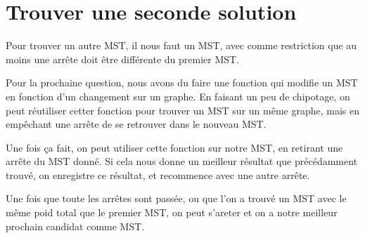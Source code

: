 \section{Trouver une seconde solution}

Pour trouver un autre MST, il nous faut un MST, avec comme restriction que au moins une arrête doit être différente du premier MST.

Pour la prochaine question, nous avons du faire une fonction qui modifie un MST en fonction d'un changement sur un graphe.
En faisant un peu de chipotage, on peut réutiliser cetter fonction pour trouver un MST sur un même graphe, mais en empêchant une arrête de se retrouver dans le nouveau MST.

Une fois ça fait, on peut utiliser cette fonction sur notre MST, en retirant une arrête du MST donné. Si cela nous donne un meilleur résultat que précédamment trouvé, on enregistre ce résultat, et recommence avec une autre arrête.

Une fois que toute les arrêtes sont passée, ou que l'on a trouvé un MST avec le même poid total que le premier MST, on peut s'areter et on a notre meilleur prochain candidat comme MST.
